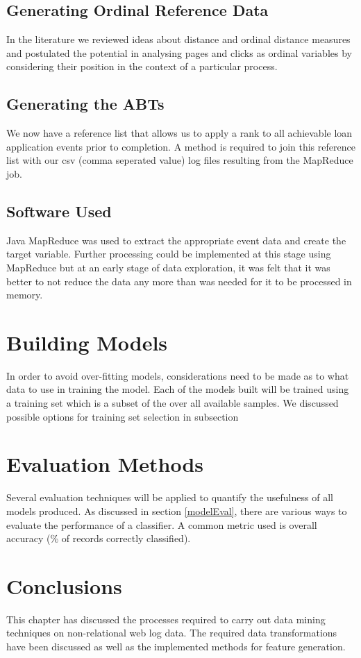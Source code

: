 \subsection{Generating Ordinal Reference Data}\label{ordRef}
In the literature we reviewed ideas about distance and ordinal distance measures and postulated the potential in analysing pages and clicks as ordinal variables by considering their position in the context of a particular process. 


\subsection{Generating the ABTs}
We now have a reference list that allows us to apply a rank to all achievable loan application events prior to completion. A method is required to join this reference list with our csv (comma seperated value) log files resulting from the MapReduce job. 


\subsection{Software Used}\label{soft}
Java MapReduce was used to extract the appropriate event data and create the target variable. Further processing could be implemented at this stage using MapReduce but at an early stage of data exploration, it was felt that it was better to not reduce the data any more than was needed for it to be processed in memory.


\section{Building Models}
In order to avoid over-fitting models, considerations need to be made as to what data to use in training the model. Each of the models built will be trained using a training set which is a subset of the over all available samples. We discussed possible options for training set selection in subsection


\section{Evaluation Methods}
Several evaluation techniques will be applied to quantify the usefulness of all models produced. As discussed in section \ref{modelEval}, there are various ways to evaluate the performance of a classifier. A common metric used is overall accuracy (\% of records correctly classified). 


\section{Conclusions}\label{desConc}
This chapter has discussed the processes required to carry out data mining techniques on non-relational web log data. The required data transformations have been discussed as well as the implemented methods for feature generation.



